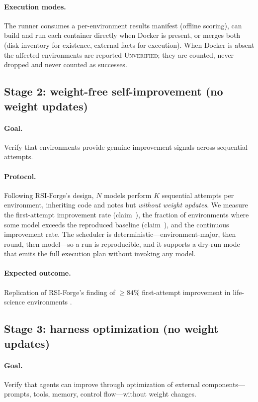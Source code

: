 \paragraph{Execution modes.} The runner consumes a per-environment results
manifest (offline scoring), can build and run each container directly when
Docker is present, or merges both (disk inventory for existence, external facts
for execution). When Docker is absent the affected environments are reported
\textsc{Unverified}; they are counted, never dropped and never counted as
successes.

\subsection{Stage 2: weight-free self-improvement (no weight updates)}
\label{sec:stage2}

\paragraph{Goal.} Verify that environments provide genuine improvement signals
across sequential attempts.

\paragraph{Protocol.} Following RSI-Forge's design, $N$ models perform $K$
sequential attempts per environment, inheriting code and notes but \emph{without
weight updates}. We measure the first-attempt improvement rate
(claim~), the fraction of environments where some model exceeds the
reproduced baseline (claim~), and the continuous improvement rate.
The scheduler is deterministic---environment-major, then round, then model---so a
run is reproducible, and it supports a dry-run mode that emits the full
execution plan without invoking any model.

\paragraph{Expected outcome.} Replication of RSI-Forge's finding of $\geq 84\%$
first-attempt improvement in life-science environments \cite{rsi-forge}.

\subsection{Stage 3: harness optimization (no weight updates)}
\label{sec:stage3}

\paragraph{Goal.} Verify that agents can improve through optimization of
external components---prompts, tools, memory, control flow---without weight
changes.

